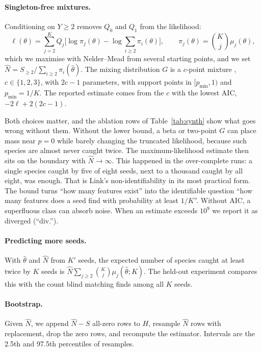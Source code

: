 \paragraph{Singleton-free mixtures.} Conditioning on $Y\ge2$ removes $Q_0$ and $Q_1$ from the likelihood:
\begin{equation}
\ell(\theta)=\sum_{j=2}^{K}Q_j\Big[\log\pi_j(\theta)-\log\textstyle\sum_{i\ge2}\pi_i(\theta)\Big],\qquad \pi_j(\theta)=\binom Kj\mu_j(\theta),
\end{equation}
which we maximise with Nelder--Mead from several starting points, and we set $\hat N=S_{\ge2}/\sum_{i\ge2}\pi_i(\hat\theta)$. The mixing distribution $G$ is a $c$-point mixture \citep{pledger2000unified}, $c\in\{1,2,3\}$, with $2c-1$ parameters, with support points in $[p_{\min},1)$ and $p_{\min}=1/K$. The reported estimate comes from the $c$ with the lowest AIC, $-2\ell+2(2c-1)$.

Both choices matter, and the ablation rows of Table~\ref{tab:synth} show what goes wrong without them. Without the lower bound, a beta or two-point $G$ can place mass near $p=0$ while barely changing the truncated likelihood, because such species are almost never caught twice. The maximum-likelihood estimate then sits on the boundary with $\hat N\to\infty$. This happened in the over-complete runs: a single species caught by five of eight seeds, next to a thousand caught by all eight, was enough. That is Link's non-identifiability \citep{link2003nonidentifiability} in its most practical form. The bound turns ``how many features exist'' into the identifiable question ``how many features does a seed find with probability at least $1/K$''. Without AIC, a superfluous class can absorb noise. When an estimate exceeds $10^9$ we report it as diverged (``div.'').

\paragraph{Predicting more seeds.} With $\hat\theta$ and $\hat N$ from $K'$ seeds, the expected number of species caught at least twice by $K$ seeds is $\hat N\sum_{j\ge2}\binom Kj\mu_j(\hat\theta;K)$. The held-out experiment compares this with the count blind matching finds among all $K$ seeds.

\paragraph{Bootstrap.} Given $\hat N$, we append $\hat N-S$ all-zero rows to $H$, resample $\hat N$ rows with replacement, drop the zero rows, and recompute the estimator. Intervals are the 2.5th and 97.5th percentiles of \BootN{} resamples.

